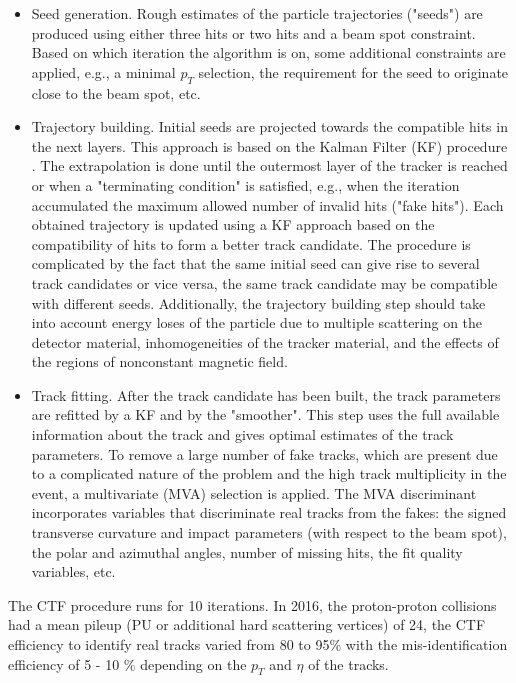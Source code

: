 \begin{itemize}
\item Seed generation. Rough estimates of the particle trajectories ("seeds") are produced using either three hits or two hits and a beam spot constraint. Based on which iteration the algorithm is on, some additional constraints are applied, e.g., a minimal $p_T$ selection, the requirement for the seed to originate close to the beam spot, etc. 
\item Trajectory building. Initial seeds are projected towards the compatible hits in the next layers. This approach is based on the Kalman Filter (KF) procedure \cite{Kalman_filter}. The extrapolation is done until the outermost layer of the tracker is reached or when a "terminating condition" is satisfied, e.g., when the iteration accumulated the maximum allowed number of invalid hits ("fake hits"). Each obtained trajectory is updated using a KF approach based on the compatibility of hits to form a better track candidate. The procedure is complicated by the fact that the same initial seed can give rise to several track candidates or vice versa, the same track candidate may be compatible with different seeds. Additionally, the trajectory building step should take into account energy loses of the particle due to multiple scattering on the detector material, inhomogeneities of the tracker material, and the effects of the regions of nonconstant magnetic field. 
\item Track fitting. After the track candidate has been built, the track parameters are refitted by a KF and by the "smoother". This step uses the full available information about the track and gives optimal estimates of the track parameters. To remove a large number of fake tracks, which are present due to a  complicated nature of the problem and the high track multiplicity in the event, a multivariate (MVA) selection is applied. The MVA discriminant incorporates variables that discriminate real tracks from the fakes: the signed transverse curvature and impact parameters (with respect to the beam spot), the polar and azimuthal angles, number of missing hits, the fit quality variables, etc. 
\end{itemize}

The CTF procedure runs for 10 iterations. In 2016, the proton-proton collisions had a mean pileup (PU or additional hard scattering vertices) of 24, the CTF efficiency to identify real tracks varied from 80 to 95$\%$ with the mis-identification efficiency of 5 - 10 $\%$ depending on the $p_T$ and $\eta$ of the tracks.

